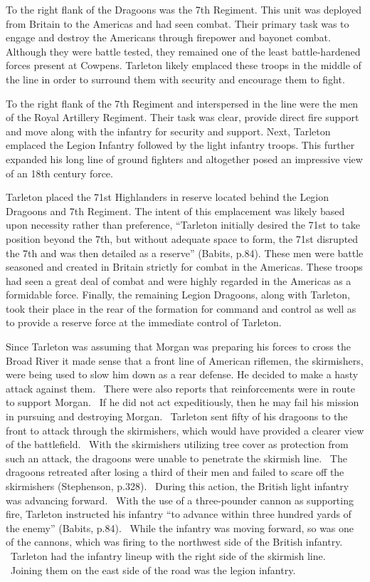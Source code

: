 To the right flank of the Dragoons was the 7th Regiment.  This unit was deployed
from Britain to the Americas and had seen combat.  Their primary task was to
engage and destroy the Americans through firepower and bayonet combat.  Although
they were battle tested, they remained one of the least battle-hardened forces
present at Cowpens.  Tarleton likely emplaced these troops in the middle of the
line in order to surround them with security and encourage them to fight.  

To the right flank of the 7th Regiment and interspersed in the line were the men
of the Royal Artillery Regiment.  Their task was clear, provide direct fire
support and move along with the infantry for security and support.  Next,
Tarleton emplaced the Legion Infantry followed by the light infantry troops.
This further expanded his long line of ground fighters and altogether posed an
impressive view of an 18th century force.

Tarleton placed the 71st Highlanders in reserve located behind the Legion
Dragoons and 7th Regiment.  The intent of this emplacement was likely based upon
necessity rather than preference, “Tarleton initially desired the 71st to take
position beyond the 7th, but without adequate space to form, the 71st disrupted
the 7th and was then detailed as a reserve” (Babits, p.84).  These men were
battle seasoned and created in Britain strictly for combat in the Americas.
These troops had seen a great deal of combat and were highly regarded in the
Americas as a formidable force.  Finally, the remaining Legion Dragoons, along
with Tarleton, took their place in the rear of the formation for command and
control as well as to provide a reserve force at the immediate control of
Tarleton.

Since Tarleton was assuming that Morgan was preparing his forces to cross the
Broad River it made sense that a front line of American riflemen, the
skirmishers, were being used to slow him down as a rear defense.  He decided to
make a hasty attack against them.  There were also reports that reinforcements
were in route to support Morgan.  If he did not act expeditiously, then he may
fail his mission in pursuing and destroying Morgan.  Tarleton sent fifty of his
dragoons to the front to attack through the skirmishers, which would have
provided a clearer view of the battlefield.  With the skirmishers utilizing tree
cover as protection from such an attack, the dragoons were unable to penetrate
the skirmish line.  The dragoons retreated after losing a third of their men and
failed to scare off the skirmishers (Stephenson, p.328).  During this action,
the British light infantry was advancing forward.  With the use of a
three-pounder cannon as supporting fire, Tarleton instructed his infantry “to
advance within three hundred yards of the enemy” (Babits, p.84).  While the
infantry was moving forward, so was one of the cannons, which was firing to the
northwest side of the British infantry.  Tarleton had the infantry lineup with
the right side of the skirmish line.  Joining them on the east side of the road
was the legion infantry.  

